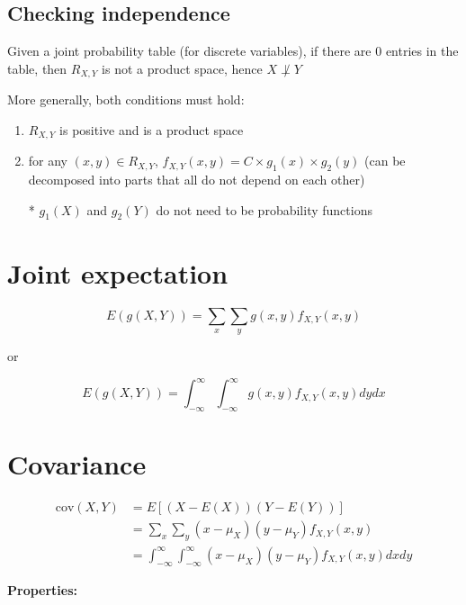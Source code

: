\documentclass[twocolumn, 8pt]{extarticle}
\begin{document}
\subsection*{Checking independence}

Given a joint probability table (for discrete variables), if there are $0$ entries in the table, then $R_{X, Y}$ is not a product space, hence $X \not\perp Y$

More generally, both conditions must hold:

\begin{enumerate}
    \item $R_{X, Y}$ is positive and is a product space
    \item for any $(x, y) \in R_{X, Y}$, $f_{X, Y}(x, y) = C \times g_1(x) \times g_2(y)$ (can be decomposed into parts that all do not depend on each other)

    * $g_1(X)$ and $g_2(Y)$ do not need to be probability functions
\end{enumerate}

\section*{Joint expectation}

$$
E(g(X, Y)) = \sum_x\sum_y g(x, y) f_{X, Y}(x, y)
$$

or 

$$
E(g(X, Y)) = \int_{-\infty}^{\infty}\int_{-\infty}^{\infty} g(x, y) f_{X, Y}(x, y) dy dx
$$

\section*{Covariance}

\begin{equation*}
    \begin{split}
        \text{cov}(X, Y) & = E[(X - E(X))(Y - E(Y))] \\
        & = \sum_x\sum_y (x - \mu_X)(y - \mu_Y)f_{X, Y}(x, y) \\
        & = \int_{-\infty}^{\infty}\int_{-\infty}^{\infty} (x - \mu_X)(y - \mu_Y)f_{X, Y}(x, y) dx dy
    \end{split}
\end{equation*}

\textbf{Properties:}
\end{document}
